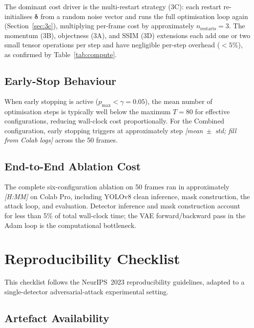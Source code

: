 \documentclass[12pt,a4paper]{report}
\begin{document}
The dominant cost driver is the multi-restart strategy (3C): each
restart re-initialises $\bm{\delta}$ from a random noise vector and
runs the full optimisation loop again
(Section~\ref{sec:3c}), multiplying per-frame cost by
approximately $n_\text{restarts} = 3$.  The momentum (3B),
objectness (3A), and SSIM (3D) extensions each add one or two small
tensor operations per step and have negligible per-step overhead
($< 5\%$), as confirmed by Table~\ref{tab:compute}.

\section{Early-Stop Behaviour}

When early stopping is active ($p_\text{max} < \gamma = 0.05$), the
mean number of optimisation steps is typically well below the maximum
$T = 80$ for effective configurations, reducing wall-clock cost
proportionally.  For the Combined configuration, early stopping
triggers at approximately step \textit{[mean~$\pm$~std; fill from
Colab logs]} across the 50 frames.

\section{End-to-End Ablation Cost}

The complete six-configuration ablation on 50 frames ran in
approximately \textit{[H:MM]} on Colab Pro, including YOLOv8 clean
inference, mask construction, the attack loop, and evaluation.
Detector inference and mask construction account for less than
5\% of total wall-clock time; the VAE forward/backward pass in the
Adam loop is the computational bottleneck.


\chapter{Reproducibility Checklist}
\label{app:reprod}

This checklist follows the NeurIPS~2023 reproducibility guidelines,
adapted to a single-detector adversarial-attack experimental setting.

\section{Artefact Availability}
\end{document}
